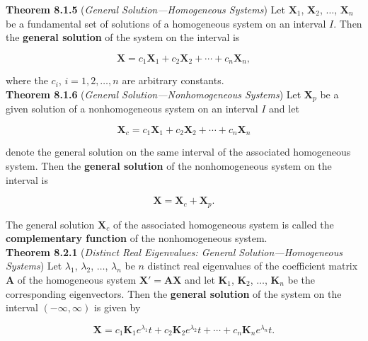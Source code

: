 \documentclass[12pt]{article}
\begin{document}
\noindent\textbf{Theorem 8.1.5} (\emph{General Solution—Homogeneous Systems}) Let \(\mathbf{X}_1\), \(\mathbf{X}_2\), \(\ldots\), \(\mathbf{X}_n\) be a fundamental set of solutions of a homogeneous system on an interval \(I\). Then the \textbf{general solution} of the system on the interval is

\begin{equation}
    \mathbf{X} = c_1\mathbf{X}_1 + c_2\mathbf{X}_2 + \cdots + c_n\mathbf{X}_n,
\end{equation}

\noindent where the \(c_i\), \(i = 1, 2, \ldots, n\) are arbitrary constants.\\

\noindent\textbf{Theorem 8.1.6} (\emph{General Solution—Nonhomogeneous Systems}) Let \(\mathbf{X}_p\) be a given solution of a nonhomogeneous system on an interval \(I\) and let

\begin{equation}
    \mathbf{X}_c = c_1\mathbf{X}_1 + c_2\mathbf{X}_2 + \cdots + c_n\mathbf{X}_n
\end{equation}

\noindent denote the general solution on the same interval of the associated homogeneous system. Then the \textbf{general solution} of the nonhomogeneous system on the interval is

\begin{equation}
    \mathbf{X} = \mathbf{X}_c + \mathbf{X}_p.
\end{equation}

\noindent The general solution \(\mathbf{X}_c\) of the associated homogeneous system is called the \textbf{complementary function} of the nonhomogeneous system.\\

\noindent\textbf{Theorem 8.2.1} (\emph{Distinct Real Eigenvalues: General Solution—Homogeneous Systems}) Let \(\lambda_1\), \(\lambda_2\), \(\ldots\), \(\lambda_n\) be \(n\) distinct real eigenvalues of the coefficient matrix \(\mathbf{A}\) of the homogeneous system \(\mathbf{X'} = \mathbf{AX}\) and let \(\mathbf{K}_1\), \(\mathbf{K}_2\), \(\ldots\), \(\mathbf{K}_n\) be the corresponding eigenvectors. Then the \textbf{general solution} of the system on the interval \((-\infty, \infty)\) is given by

\begin{equation}
    \mathbf{X} = c_1\mathbf{K}_1 e^{\lambda_1}t + c_2\mathbf{K}_2 e^{\lambda_2}t + \cdots + c_n\mathbf{K}_n e^{\lambda_n}t.
\end{equation}
\end{document}
